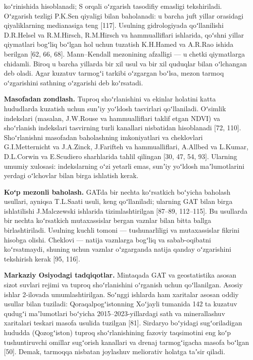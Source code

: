 \documentclass[14pt,a4paper,oneside]{extreport}
\begin{document}
koʻrinishida hisoblanadi; S orqali oʻzgarish tasodifiy emasligi
tekshiriladi. Oʻzgarish tezligi P.K.Sen qiyaligi bilan baholanadi: u
barcha juft yillar orasidagi qiyaliklarning medianasiga teng {[}117{]}.
Usulning gidrologiyada qoʻllanilishi D.R.Helsel va R.M.Hirsch,
R.M.Hirsch va hammualliflari ishlarida, qoʻshni yillar qiymatlari
bogʻliq boʻlgan hol uchun tuzatish K.H.Hamed va A.R.Rao ishida berilgan
{[}62, 66, 68{]}. Mann--Kendall mezonining afzalligi --- u chetki
qiymatlarga chidamli. Biroq u barcha yillarda bir xil usul va bir xil
quduqlar bilan oʻlchangan deb oladi. Agar kuzatuv tarmogʻi tarkibi
oʻzgargan boʻlsa, mezon tarmoq oʻzgarishini sathning oʻzgarishi deb
koʻrsatadi.

\textbf{Masofadan zondlash.} Tuproq shoʻrlanishini va ekinlar holatini
katta hududlarda kuzatish uchun sunʼiy yoʻldosh tasvirlari qoʻllaniladi.
Oʻsimlik indekslari (masalan, J.W.Rouse va hammualliflari taklif etgan
NDVI) va shoʻrlanish indekslari tasvirning turli kanallari nisbatidan
hisoblanadi {[}72, 110{]}. Shoʻrlanishni masofadan baholashning
imkoniyatlari va cheklovlari G.I.Metternicht va J.A.Zinck, J.Farifteh va
hammualliflari, A.Allbed va L.Kumar, D.L.Corwin va E.Scudiero
sharhlarida tahlil qilingan {[}30, 47, 54, 93{]}. Ularning umumiy
xulosasi: indekslarning oʻzi yetarli emas, sunʼiy yoʻldosh
maʼlumotlarini yerdagi oʻlchovlar bilan birga ishlatish kerak.

\textbf{Koʻp mezonli baholash.} GATda bir nechta koʻrsatkich boʻyicha
baholash usullari, ayniqsa T.L.Saati usuli, keng qoʻllaniladi; ularning
GAT bilan birga ishlatilishi J.Malczewski ishlarida tizimlashtirilgan
{[}87--89, 112--115{]}. Bu usullarda bir nechta koʻrsatkich
mutaxassislar bergan vaznlar bilan bitta ballga birlashtiriladi.
Usulning kuchli tomoni --- tushunarliligi va mutaxassislar fikrini
hisobga olishi. Cheklovi --- natija vaznlarga bogʻliq va sabab-oqibatni
koʻrsatmaydi, shuning uchun vaznlar oʻzgarganda natija qanday
oʻzgarishini tekshirish kerak {[}95, 116{]}.

\textbf{Markaziy Osiyodagi tadqiqotlar.} Mintaqada GAT va geostatistika
asosan sizot suvlari rejimi va tuproq shoʻrlanishini oʻrganish uchun
qoʻllanilgan. Asosiy ishlar 2-ilovada umumlashtirilgan. Soʻnggi ishlarda
ham xaritalar asosan oddiy usullar bilan tuziladi: Qoraqalpogʻistonning
Xoʻjayli tumanida 142 ta kuzatuv qudugʻi maʼlumotlari boʻyicha
2015--2023-yillardagi sath va minerallashuv xaritalari teskari masofa
usulida tuzilgan {[}81{]}. Sirdaryo boʻyidagi sugʻoriladigan hududda
(Qozogʻiston) tuproq shoʻrlanishining fazoviy taqsimotini eng koʻp
tushuntiruvchi omillar sugʻorish kanallari va drenaj tarmogʻigacha
masofa boʻlgan {[}50{]}. Demak, tarmoqqa nisbatan joylashuv meliorativ
holatga taʼsir qiladi.
\end{document}
